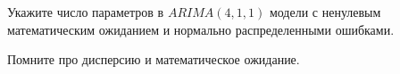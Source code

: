 
\begin{question}
Укажите число параметров в \(ARIMA(4, 1, 1)\) модели с ненулевым математическим ожиданием и нормально распределенными ошибками.
\end{question}

\begin{solution}
Помните про дисперсию и математическое ожидание.
\end{solution}

